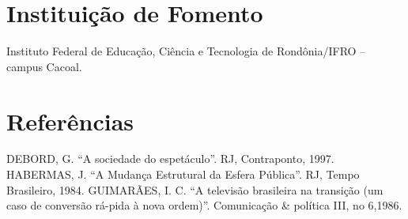 \documentclass[article,12pt,onesidea,4paper,english,brazil]{abntex2}
\begin{document}
	
	\section*{Instituição de Fomento}
	
Instituto Federal de Educação, Ciência e Tecnologia de Rondônia/IFRO – campus
Cacoal.

	
	\section*{Referências}
	
	\noindent DEBORD, G. “A sociedade do espetáculo”. RJ, Contraponto, 1997.
	\noindent HABERMAS, J. “A Mudança Estrutural da Esfera Pública”. RJ, Tempo Brasileiro, 1984. 
	\noindent GUIMARÃES, I. C. “A televisão brasileira na transição (um caso de conversão rá-pida à nova ordem)”. Comunicação & política III, no 6,1986.
	
	
\end{document}
